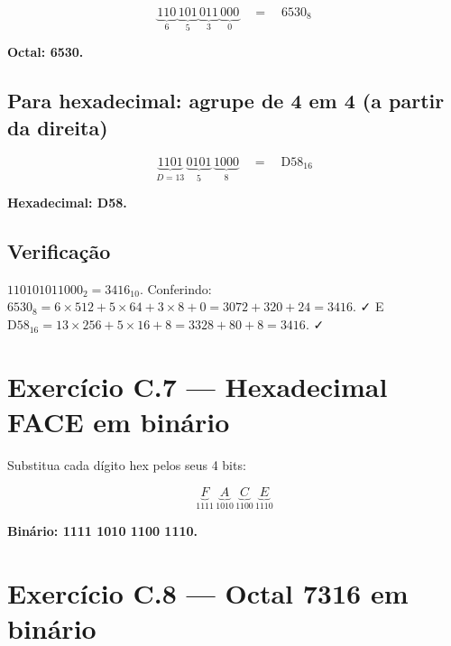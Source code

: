 \documentclass[11pt,a4paper]{article}
\begin{document}
\[
\underbrace{110}_{6} \, \underbrace{101}_{5} \, \underbrace{011}_{3} \, \underbrace{000}_{0} \quad = \quad \boxed{6530_8}
\]

\begin{resposta}\textbf{Octal: 6530.}\end{resposta}

\subsection*{Para hexadecimal: agrupe de 4 em 4 (a partir da direita)}

\[
\underbrace{1101}_{D=13} \, \underbrace{0101}_{5} \, \underbrace{1000}_{8} \quad = \quad \boxed{\text{D58}_{16}}
\]

\begin{resposta}\textbf{Hexadecimal: D58.}\end{resposta}

\subsection*{Verifica\c{c}\~ao}

$110101011000_2 = 3416_{10}$. Conferindo: $6530_8 = 6 \times 512 + 5 \times 64 + 3 \times 8 + 0 = 3072 + 320 + 24 = 3416$. ✓
E $\text{D58}_{16} = 13 \times 256 + 5 \times 16 + 8 = 3328 + 80 + 8 = 3416$. ✓

\newpage
\section{Exerc\'icio C.7 --- Hexadecimal FACE em bin\'ario}

Substitua cada d\'igito hex pelos seus 4 bits:

\[
\underbrace{F}_{1111} \, \underbrace{A}_{1010} \, \underbrace{C}_{1100} \, \underbrace{E}_{1110}
\]

\begin{resposta}\textbf{Bin\'ario: 1111 1010 1100 1110.}\end{resposta}

\section{Exerc\'icio C.8 --- Octal 7316 em bin\'ario}
\end{document}
